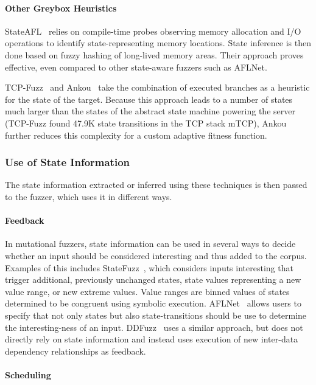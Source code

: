 \documentclass[twocolumn]{article}
\let\savedCite=\cite
\renewcommand{\cite}{\unskip~\savedCite}
\begin{document}
\paragraph{Other Greybox Heuristics}

StateAFL\cite{StateAFL} relies on compile-time probes observing memory allocation and I/O operations to identify state-representing memory locations. State inference is then done based on fuzzy hashing of long-lived memory areas. Their approach proves effective, even compared to other state-aware fuzzers such as AFLNet.

TCP-Fuzz\cite{TCPFuzz} and Ankou\cite{Ankou} take the combination of executed branches as a heuristic for the state of the target. Because this approach leads to a number of states much larger than the states of the abstract state machine powering the server (TCP-Fuzz found 47.9K state transitions in the TCP stack mTCP), Ankou further reduces this complexity for a custom adaptive fitness function.

\subsubsection{Use of State Information}
\label{RelatedWorks:ProtocolFuzzing:UseOfState}

The state information extracted or inferred using these techniques is then passed to the fuzzer, which uses it in different ways.

\paragraph{Feedback}

In mutational fuzzers, state information can be used in several ways to decide whether an input should be considered interesting and thus added to the corpus. Examples of this includes StateFuzz\cite{StateFuzz}, which considers inputs interesting that trigger additional, previously unchanged states, state values representing a new value range, or new extreme values. Value ranges are binned values of states determined to be congruent using symbolic execution. AFLNet\cite{AFLNET} allows users to specify that not only states but also state-transitions should be use to determine the interesting-ness of an input. DDFuzz\cite{DDFuzz} uses a similar approach, but does not directly rely on state information and instead uses execution of new inter-data dependency relationships as feedback.

\paragraph{Scheduling}
\end{document}
